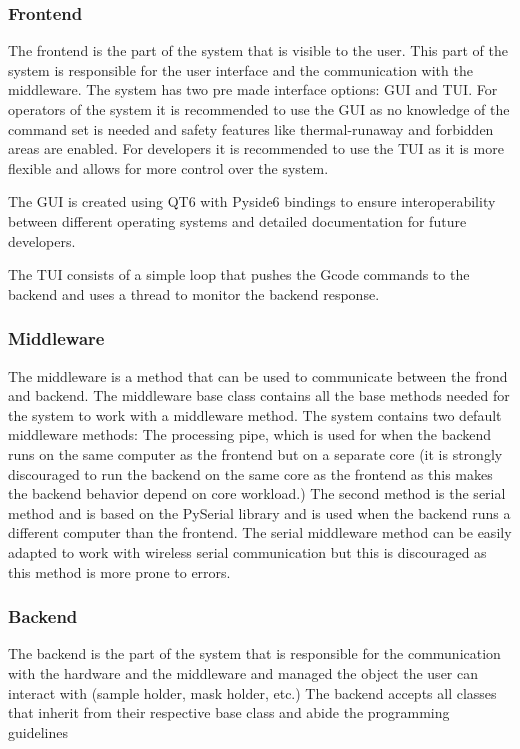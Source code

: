 \documentclass[10pt]{article}
\begin{document}
\subsubsection{Frontend}
The frontend is the part of the system that is visible to the user.
This part of the system is responsible for the user interface and the communication with the middleware.
The system has two pre made interface options: GUI and TUI.
For operators of the system it is recommended to use the GUI as no knowledge of the command set is needed and safety features like thermal-runaway and forbidden areas are enabled.
For developers it is recommended to use the TUI as it is more flexible and allows for more control over the system.

The GUI is created using QT6 with Pyside6 bindings  to ensure interoperability between different operating systems and detailed documentation for future developers.

The TUI consists of a simple loop that pushes the Gcode commands to the backend and uses a thread to monitor the backend response.

\subsubsection{Middleware}
The middleware is a method that can be used to communicate between the frond and backend. 
The middleware base class contains all the base methods needed for the system to work with a middleware method.
The system contains two default middleware methods: The processing pipe, which is used for when the backend runs on the same computer as the frontend but on a separate core (it is strongly discouraged to run the backend on the same core as the frontend as this makes the backend behavior depend on core workload.) 
The second method is the serial method and is based on the PySerial library  and is used when the backend runs a different computer than the frontend.
The serial middleware method can be easily adapted to work with wireless serial communication but this is discouraged as this method is more prone to errors.

\subsubsection{Backend}
The backend is the part of the system that is responsible for the communication with the hardware and the middleware and managed the object the user can interact with (sample holder, mask holder, etc.)
The backend accepts all classes that inherit from their respective base class and abide the programming guidelines 
\end{document}
